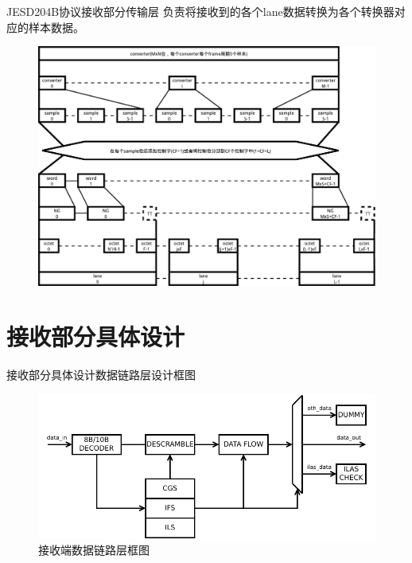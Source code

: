 \documentclass{beamer}
\begin{document}
\begin{frame}{JESD204B协议接收部分}{传输层}
  负责将接收到的各个lane数据转换为各个转换器对应的样本数据。
  \begin{figure}
	\centering
	\includegraphics[scale=0.3]{./img/user_data_format_for_multiple_lanes.pdf}
	\end{figure}
\end{frame}

\section{接收部分具体设计}

\begin{frame}{接收部分具体设计}{数据链路层设计框图}
  \begin{figure}
  \centering
  \includegraphics[scale=0.7]{./img/recv_link_layer_top.pdf}
  \caption{接收端数据链路层框图}
  \end{figure}
\end{frame}
\end{document}
